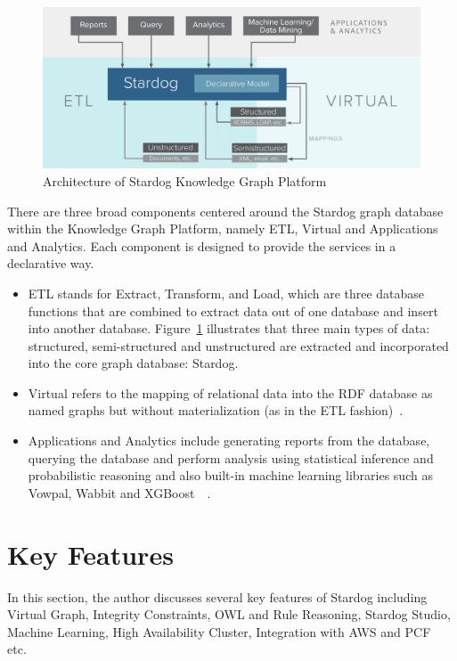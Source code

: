 	\begin{figure}[!ht]
	  \centering\includegraphics[width=\columnwidth]{images/stardog-architecture.png}
	  \caption{Architecture of Stardog Knowledge Graph 
	  Platform~\cite{hid-sp18-405-blog-stardog-kgraph}}\label{sa:archi}
	\end{figure}

	There are three broad components centered around the Stardog graph 
	database within the Knowledge Graph Platform, namely ETL, Virtual and 
	Applications and Analytics. Each component is designed to provide 
	the services in a declarative way. 
	
	\begin{itemize}
		
		\item ETL stands for Extract, Transform, and Load, which are three 
		database functions that are combined to extract data out of one 
		database and insert into another database. Figure~\ref{sa:archi} 
		illustrates that three main types of data: structured, semi-structured 
		and unstructured are extracted and incorporated into the core graph 
		database: Stardog. 
		
		\item Virtual refers to the mapping of relational data into the RDF 
		database as named graphs but without materialization (as in the ETL 
		fashion)~\cite{hid-sp18-405-blog-stardog-virtual}. 
		
		\item Applications and Analytics include generating reports from the 
		database, querying the database and perform analysis using statistical 
		inference and probabilistic reasoning and also built-in machine learning 
		libraries such as Vowpal, Wabbit and 
		XGBoost~\cite{hid-sp18-405-blog-stardog-ml}~\cite{hid-sp18-405-blog-stardog-xgboost}.
	
\end{itemize}

\section{Key Features}
\label{s:keyf}
	In this section, the author discusses several key features of Stardog 
	including Virtual Graph, Integrity Constraints, OWL and Rule 
	Reasoning, Stardog Studio, Machine Learning, High Availability Cluster, 
	Integration with AWS and PCF etc.\

